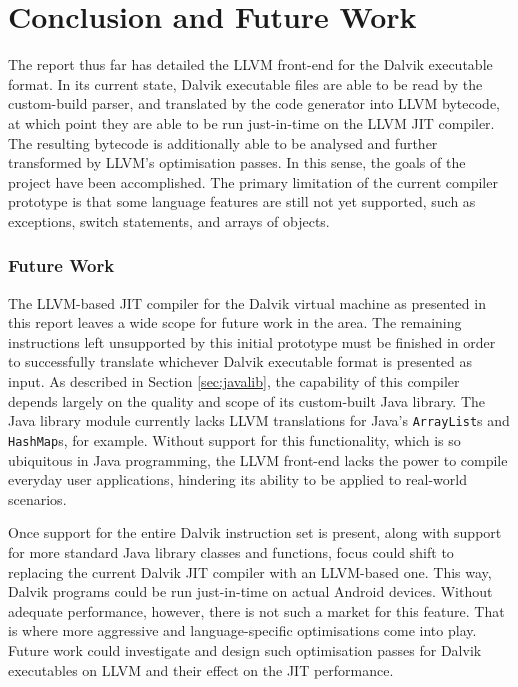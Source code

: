 \chapter{Conclusion and Future Work}
\label{chap:conclusion}

The report thus far has detailed the LLVM front-end for the Dalvik executable format. In its current state, Dalvik executable files are able to be read by the custom-build parser, and translated by the code generator into LLVM bytecode, at which point they are able to be run just-in-time on the LLVM JIT compiler. The resulting bytecode is additionally able to be analysed and further transformed by LLVM's optimisation passes. In this sense, the goals of the project have been accomplished. The primary limitation of the current compiler prototype is that some language features are still not yet supported, such as exceptions, switch statements, and arrays of objects.

\subsection*{Future Work}

The LLVM-based JIT compiler for the Dalvik virtual machine as presented in this report leaves a wide scope for future work in the area. The remaining instructions left unsupported by this initial prototype must be finished in order to successfully translate whichever Dalvik executable format is presented as input. As described in Section \ref{sec:javalib}, the capability of this compiler depends largely on the quality and scope of its custom-built Java library. The Java library module currently lacks LLVM translations for Java's \verb|ArrayList|s and \verb|HashMap|s, for example. Without support for this functionality, which is so ubiquitous in Java programming, the LLVM front-end lacks the power to compile everyday user applications, hindering its ability to be applied to real-world scenarios.

Once support for the entire Dalvik instruction set is present, along with support for more standard Java library classes and functions, focus could shift to replacing the current Dalvik JIT compiler with an LLVM-based one. This way, Dalvik programs could be run just-in-time on actual Android devices. Without adequate performance, however, there is not such a market for this feature. That is where more aggressive and language-specific optimisations come into play. Future work could investigate and design such optimisation passes for Dalvik executables on LLVM and their effect on the JIT performance.
